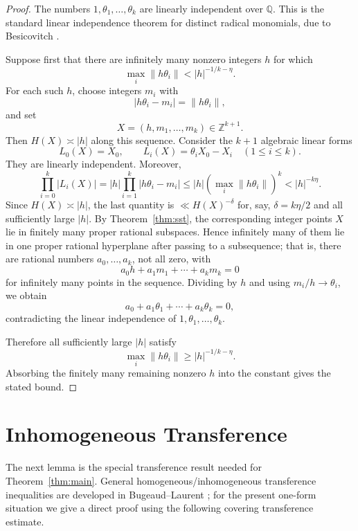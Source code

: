 \documentclass[11pt]{article}
\theoremstyle{remark}
\newcommand{\Z}{\mathbb Z}
\newcommand{\Q}{\mathbb Q}
\begin{document}
\begin{proof}
The numbers $1,\theta_1,\ldots,\theta_k$ are linearly independent over $\Q$. This is the standard linear independence theorem for distinct radical monomials, due to Besicovitch \cite{Besicovitch1940}.

\bigskip
\noindent
Suppose first that there are infinitely many nonzero integers $h$ for which
\[
  \max_i\|h\theta_i\|< |h|^{-1/k-\eta}.
\]
For each such $h$, choose integers $m_i$ with
\[
  |h\theta_i-m_i|=\|h\theta_i\|,
\]
and set
\[
  X=(h,m_1,\ldots,m_k)\in\Z^{k+1}.
\]
Then $H(X)\asymp |h|$ along this sequence. Consider the $k+1$ algebraic linear forms
\[
  L_0(X)=X_0,
  \qquad
  L_i(X)=\theta_iX_0-X_i\quad(1\leq i\leq k).
\]
They are linearly independent. Moreover,
\[
  \prod_{i=0}^k |L_i(X)|
  = |h|\prod_{i=1}^k |h\theta_i-m_i|
  \leq |h|\left(\max_i\|h\theta_i\|\right)^k
  < |h|^{-k\eta}.
\]
Since $H(X)\asymp |h|$, the last quantity is $\ll H(X)^{-\delta}$ for, say, $\delta=k\eta/2$ and all sufficiently large $|h|$. By Theorem~\ref{thm:sst}, the corresponding integer points $X$ lie in finitely many proper rational subspaces. Hence infinitely many of them lie in one proper rational hyperplane after passing to a subsequence; that is, there are rational numbers $a_0,\ldots,a_k$, not all zero, with
\[
  a_0h+a_1m_1+\cdots+a_km_k=0
\]
for infinitely many points in the sequence. Dividing by $h$ and using $m_i/h\to\theta_i$, we obtain
\[
  a_0+a_1\theta_1+\cdots+a_k\theta_k=0,
\]
contradicting the linear independence of $1,\theta_1,\ldots,\theta_k$.

\bigskip
\noindent
Therefore all sufficiently large $|h|$ satisfy
\[
  \max_i\|h\theta_i\|\geq |h|^{-1/k-\eta}.
\]
Absorbing the finitely many remaining nonzero $h$ into the constant gives the stated bound.
\end{proof}

\section{Inhomogeneous Transference}\label{sec:transference}

The next lemma is the special transference result needed for Theorem~\ref{thm:main}. General homogeneous/inhomogeneous transference inequalities are developed in Bugeaud--Laurent \cite{BugeaudLaurent2005}; for the present one-form situation we give a direct proof using the following covering transference estimate.
\end{document}
